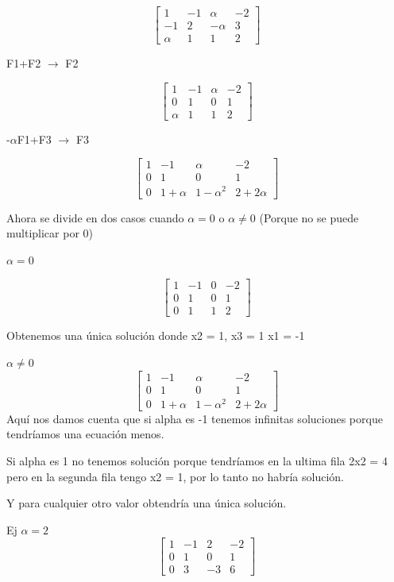 \documentclass[12pt]{article}
\begin{document}
\[
\begin{bmatrix}
1 & -1 & \alpha & -2 \\
-1 & 2 & -\alpha& 3 \\
\alpha & 1 & 1 & 2
\end{bmatrix}
\]

F1+F2 $\longrightarrow $ F2

\[
\begin{bmatrix}
1 & -1 & \alpha & -2 \\
0 & 1 & 0&1 \\
\alpha & 1 & 1 & 2
\end{bmatrix}
\]

-$\alpha$F1+F3 $\longrightarrow $ F3

\[
\begin{bmatrix}
1 & -1 & \alpha & -2 \\
0 & 1 & 0&1 \\
0 & 1+\alpha & 1-\alpha^2 & 2+2\alpha
\end{bmatrix}
\]

Ahora se divide en dos casos cuando $\alpha=0$ o $\alpha\neq 0$ (Porque no se puede multiplicar por 0)

$\alpha=0$

\[
\begin{bmatrix}
1 & -1 & 0 & -2 \\
0 & 1 & 0&1 \\
0 & 1 & 1 & 2
\end{bmatrix}
\]

Obtenemos una única solución donde x2 = 1, x3 = 1 x1 = -1

$\alpha\neq 0$
\[
\begin{bmatrix}
1 & -1 & \alpha & -2 \\
0 & 1 & 0&1 \\
0 & 1+\alpha & 1-\alpha^2 & 2+2\alpha
\end{bmatrix}
\]
Aquí nos damos cuenta que si alpha es -1 tenemos infinitas soluciones porque tendríamos una ecuación menos.


Si alpha es 1 no tenemos solución porque tendríamos en la ultima fila 2x2 = 4 pero en la segunda fila tengo x2 = 1, 
por lo tanto no habría solución.

Y para cualquier otro valor obtendría una única solución.

Ej 
$\alpha=2$
\[
\begin{bmatrix}
1 & -1 & 2 & -2 \\
0 & 1 & 0&1 \\
0 & 3 & -3 & 6
\end{bmatrix}
\]
\end{document}

